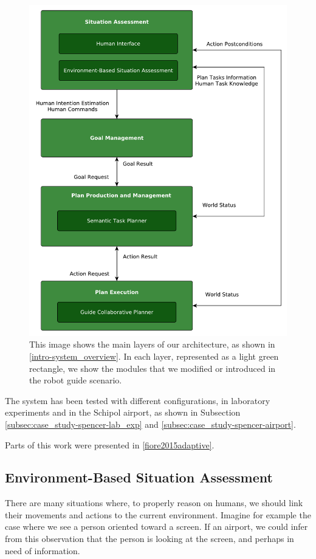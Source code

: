 \begin{figure}[ht!]
	\centering
	\includegraphics[scale=0.45]{img/case_study/spencer/architecture.pdf}
	\caption{This image shows the main layers of our architecture, as shown in \ref{intro-system_overview}. In each layer, represented as a light green rectangle, we show the modules that we modified or introduced in the robot guide scenario.}
	\label{fig:case_study-spencer-architecture}
\end{figure}

The system has been tested with different configurations, in laboratory experiments and in the Schipol airport, as shown in Subsection \ref{subsec:case_study-spencer-lab_exp} and \ref{subsec:case_study-spencer-airport}.

Parts of this work were presented in \ref{fiore2015adaptive}.

\subsection{Environment-Based Situation Assessment}
\label{subsec:case_study-spencer-intention}
There are many situations where, to properly reason on humans, we should link their movements and actions to the current environment. Imagine for example the case where we see a person oriented toward a screen. If an airport, we could infer from this observation that the person is looking at the screen, and perhaps in need of information. 

